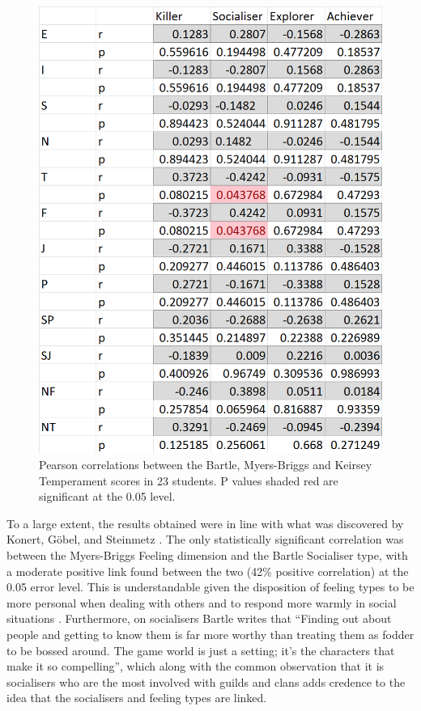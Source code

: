 \documentclass[12pt,a4paper,twoside]{report}
\begin{document}
\begin{figure}
	\begin{center}
		\includegraphics[width=1\textwidth]{../img/results.png}
		\caption{Pearson correlations between the Bartle, Myers-Briggs and Keirsey Temperament scores in 23 students. P values shaded red are significant at the 0.05 level.}
		\label{results}
	\end{center}
\end{figure}

To a large extent, the results obtained were in line with what was discovered by Konert, G{\"o}bel, and Steinmetz \cite{konertmodeling}. The only statistically significant correlation was between the Myers-Briggs Feeling dimension and the Bartle Socialiser type, with a moderate positive link found between the two (42\% positive correlation) at the 0.05 error level. This is understandable given the disposition of feeling types to be more personal when dealing with others and to respond more warmly in social situations \cite{keirsey1984}. Furthermore, on socialisers Bartle writes that ``Finding out about people and getting to know them is far more worthy than treating them as fodder to be bossed around. The game world is just a setting; it's the characters that make it so compelling''\cite{bartle1996hearts}, which along with the common observation that it is socialisers who are the most involved with guilds and clans adds credence to the idea that the socialisers and feeling types are linked.
\end{document}
